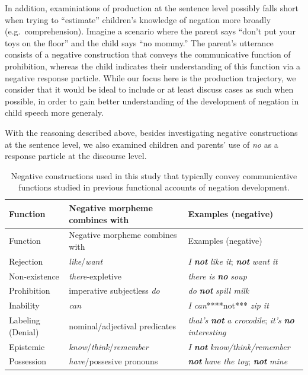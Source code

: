 \documentclass[
  english,
  man,floatsintext]{apa6}
\begin{document}
In addition, examiniations of production at the sentence level possibly falls short when trying to ``estimate'' children's knowledge of negation more broadly (e.g.~comprehension). Imagine a scenario where the parent says ``don't put your toys on the floor'' and the child says ``no mommy.'' The parent's utterance consists of a negative construction that conveys the communicative function of prohibition, whereas the child indicates their understanding of this function via a negative response particle. While our focus here is the production trajectory, we consider that it would be ideal to include or at least discuss cases as such when possible, in order to gain better understanding of the development of negation in child speech more generaly.

With the reasoning described above, besides investigating negative constructions at the sentence level, we also examined children and parents' use of \emph{no} as a response particle at the discourse level.

\begin{longtable}[]{@{}
  >{\raggedright\arraybackslash}p{}
  >{\raggedright\arraybackslash}p{}
  >{\raggedright\arraybackslash}p{}@{}}
\caption{\label{tab:constructions} Negative constructions used in this study that typically convey communicative functions studied in previous functional accounts of negation development.}\tabularnewline
\toprule
Function & Negative morpheme combines with & Examples (negative) \\
\midrule
\endfirsthead
\toprule
Function & Negative morpheme combines with & Examples (negative) \\
\midrule
\endhead
Rejection & \emph{like}/\emph{want} & \emph{I} \textbf{\emph{not}} \emph{like it}; \textbf{\emph{not}} \emph{want it} \\
Non-existence & \emph{there}-expletive & \emph{there is} \textbf{\emph{no}} \emph{soup} \\
Prohibition & imperative subjectless \emph{do} & \emph{do} \textbf{\emph{not}} \emph{spill milk} \\
Inability & \emph{can} & \emph{I can}****not*** \emph{zip it} \\
Labeling (Denial) & nominal/adjectival predicates & \emph{that's} \textbf{\emph{not}} \emph{a crocodile}; \emph{it's} \textbf{\emph{no}} \emph{interesting} \\
Epistemic & \emph{know}/\emph{think}/\emph{remember} & \emph{I} \textbf{\emph{not}} \emph{know/think/remember} \\
Possession & \emph{have}/possesive pronouns & \textbf{\emph{not}} \emph{have the toy}; \textbf{\emph{not}} \emph{mine} \\
\bottomrule
\end{longtable}
\end{document}

